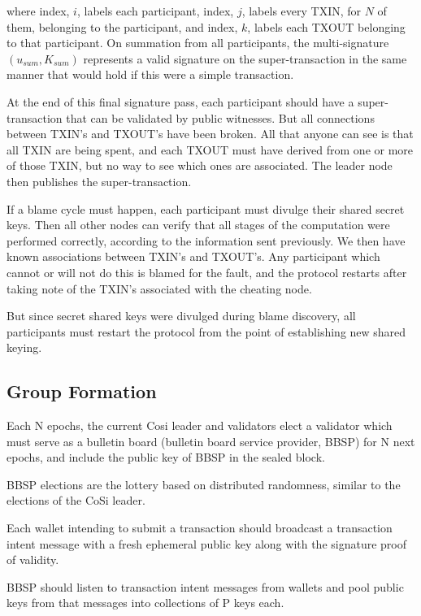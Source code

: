 \documentclass[a4paper, 10pt, conference]{ieeeconf}
\begin{document}
where index, $i$, labels each participant, index, $j$, labels every TXIN, for $N$ of them, belonging to the participant, and index, $k$, labels each TXOUT belonging to that participant. On summation from all participants, the multi-signature $(u_{\mathit{sum}}, K_{\mathit{sum}})$ represents a valid signature on the super-transaction in the same manner that would hold if this were a simple transaction.

At the end of this final signature pass, each participant should have a super-transaction that can be validated by public witnesses. But all connections between TXIN's and TXOUT's have been broken. All that anyone can see is that all TXIN are being spent, and each TXOUT must have derived from one or more of those TXIN, but no way to see which ones are associated. The leader node then publishes the super-transaction.

If a blame cycle must happen, each participant must divulge their shared secret keys. Then all other nodes can verify that all stages of the computation were performed correctly, according to the information sent previously. We then have known associations between TXIN's and TXOUT's. Any participant which cannot or will not do this is blamed for the fault, and the protocol restarts after taking note of the TXIN's associated with the cheating node.

But since secret shared keys were divulged during blame discovery, all participants must restart the protocol from the point of establishing new shared keying.

\subsection{Group Formation}
Each N epochs, the current Cosi leader and validators elect a validator which must serve as a bulletin board (bulletin board service provider, BBSP) for N next epochs, and include the public key of BBSP in the sealed block.

BBSP elections are the lottery based on distributed randomness, similar to the elections of the CoSi leader.

Each wallet intending to submit a transaction should broadcast a transaction intent message with a fresh ephemeral public key along with the signature proof of validity.

BBSP should listen to transaction intent messages from wallets and pool public keys from that messages into collections of P keys each.
\end{document}

